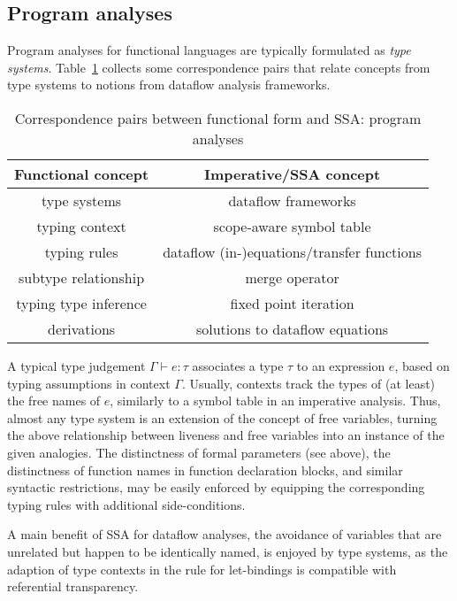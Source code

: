 \subsection{Program analyses}
Program analyses for functional languages are typically formulated as
\emph{type systems}. Table~\ref{tableFunctionalCorrespondencesII} collects some
correspondence pairs that relate concepts from type systems to notions
from dataflow analysis frameworks.
\begin{table}
\begin{center}
\begin{tabular}{|c|c|}
  \hline Functional concept & Imperative/SSA concept\\ 
  \hline
  type systems & dataflow frameworks\\
  typing context & scope-aware symbol table\\
  typing
  rules & dataflow (in-)equations/transfer functions\\
  subtype relationship & merge operator\\
  typing
  type inference & fixed point iteration\\
  derivations & solutions to dataflow equations\\
  \hline
\end{tabular}
\end{center}
\caption{\label{tableFunctionalCorrespondencesII}
  Correspondence pairs between functional form and SSA: program analyses}
\end{table}
 A typical type judgement $\Gamma
\vdash e:\tau$ 
associates a type $\tau$ to an expression $e$, based on typing
assumptions in context $\Gamma$. Usually, contexts track the types of
(at least) the free names of $e$, similarly to a symbol table in an
imperative analysis. Thus, almost any type system is an extension of
the concept of free variables, turning the above relationship between
liveness and free variables into an instance of the given
analogies. The distinctness of formal parameters (see above), the
distinctness of function names in function declaration blocks, and
similar syntactic restrictions, may be easily enforced by equipping
the corresponding typing rules with additional side-conditions.

A main benefit of SSA for dataflow analyses, the avoidance of
variables that are unrelated but happen to be identically named, is
enjoyed by type systems, as the adaption of type contexts in the rule
for let-bindings is compatible with referential transparency.

